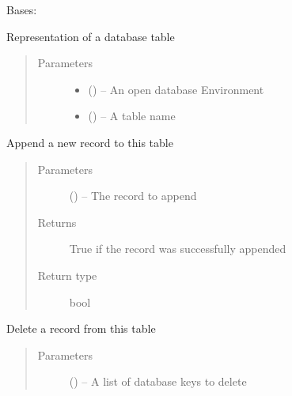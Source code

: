\documentclass[letterpaper,10pt,english]{sphinxmanual}
\begin{document}
\begin{fulllineitems}
\label{\detokenize{index:mamba.Table}}
Bases: 

Representation of a database table
\begin{quote}\begin{description}
\item[{Parameters}] \leavevmode\begin{itemize}
\item {} 
 () -- An open database Environment

\item {} 
 () -- A table name

\end{itemize}

\end{description}\end{quote}

\begin{fulllineitems}
\label{\detokenize{index:mamba.Table.append}}
Append a new record to this table
\begin{quote}\begin{description}
\item[{Parameters}] \leavevmode
{} () -- The record to append

\item[{Returns}] \leavevmode
True if the record was successfully appended

\item[{Return type}] \leavevmode
bool

\end{description}\end{quote}

\end{fulllineitems}


\begin{fulllineitems}
\label{\detokenize{index:mamba.Table.delete}}
Delete a record from this table
\begin{quote}\begin{description}
\item[{Parameters}] \leavevmode
{} () -- A list of database keys to delete


\end{description}
\end{quote}
\end{fulllineitems}
\end{fulllineitems}
\end{document}
